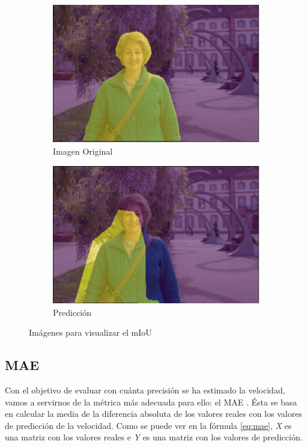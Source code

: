 \begin{figure}[H]
  \centering
  \begin{subfigure}[b]{0.45\linewidth}
    \includegraphics[width=\linewidth]{Figuras/Iou_1.eps}
    \caption{Imagen Original}
  \end{subfigure}
    \begin{subfigure}[b]{0.45\linewidth}
    \includegraphics[width=\linewidth]{Figuras/IoU_2.eps}
    \caption{Predicción}
  \end{subfigure}
  \caption{Imágenes para visualizar el \ac{mIoU}}
\end{figure}

\subsection{MAE}

Con el objetivo de evaluar con cuánta precisión se ha estimado la velocidad, vamos a servirnos de la métrica más adecuada para ello: el \ac{MAE} \cite{mae}. Ésta se basa en calcular la media de la diferencia absoluta de los valores reales con los valores de predicción de la velocidad. Como se puede ver en la fórmula \ref{eq:mae}, \textit{X} es una matriz con los valores reales e \textit{Y} es una matriz con los valores de predicción.


